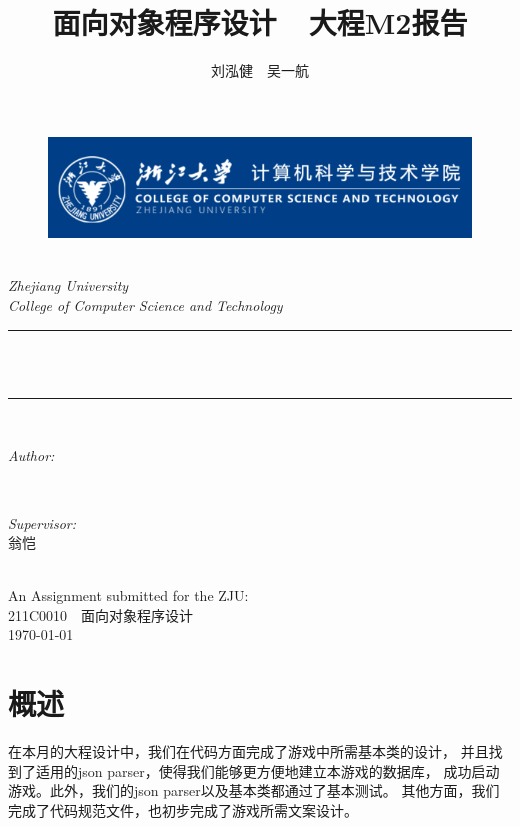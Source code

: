 \documentclass[UTF8]{ctexart}
\title{\heiti 面向对象程序设计\ \ 大程M2报告}
\author{\Large \kaishu \textup{刘泓健\ \ 吴一航}}
\begin{document}
\begin{titlepage}
	\newcommand{\HRule}{\rule{\linewidth}{0.5mm}}
	\begin{figure}
        \flushleft
        \includegraphics[scale=0.4]{0.png}
    \end{figure}
    \center 
	\quad\\[1.5cm]
	\textsl{\Large Zhejiang University }\\[0.5cm] 
	\textsl{\large College of Computer Science and Technology}\\[0.5cm] 
	\makeatletter
	\HRule \\[0.4cm]
	{ \huge \bfseries \@title}\\[0.4cm] 
	\HRule \\[1.5cm]
	\begin{minipage}{0.4\textwidth}
		\begin{flushleft} \Large
			\emph{Author:}\\
			\@author 
		\end{flushleft}
	\end{minipage}
	~
	\begin{minipage}{0.4\textwidth}
		\begin{flushright} \Large \kaishu
			\emph{Supervisor:} \\
			\textup{翁恺}
		\end{flushright}
	\end{minipage}\\[3cm]
	\makeatother
	{\large An Assignment submitted for the ZJU:}\\[0.5cm]
	{\large {211C0010\ \ 面向对象程序设计}}\\[0.5cm]
	{\large \today}\\[2cm] 
	\vfill 
\end{titlepage}
    
    \section{概述}
    在本月的大程设计中，我们在代码方面完成了游戏中所需基本类的设计，
    并且找到了适用的json parser，使得我们能够更方便地建立本游戏的数据库，
    成功启动游戏。此外，我们的json parser以及基本类都通过了基本测试。
    其他方面，我们完成了代码规范文件，也初步完成了游戏所需文案设计。
\end{document}
